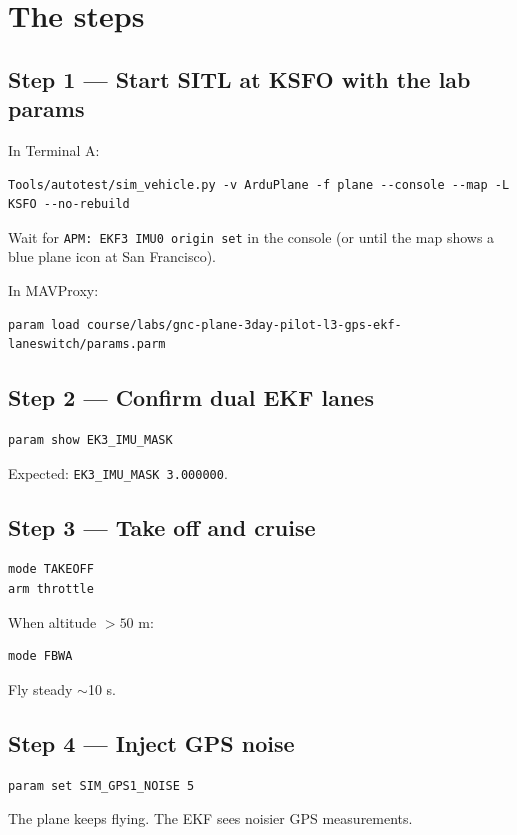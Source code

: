 \documentclass[a4paper,11pt,twoside]{article}
\begin{document}
\section*{The steps}

\subsection*{Step 1 --- Start SITL at KSFO with the lab params}
In Terminal A:
\begin{Verbatim}[frame=single,fontsize=\small]
Tools/autotest/sim_vehicle.py -v ArduPlane -f plane --console --map -L KSFO --no-rebuild
\end{Verbatim}
Wait for \texttt{APM: EKF3 IMU0 origin set} in the console (or until the map shows a blue plane icon at San Francisco).

In MAVProxy:
\begin{Verbatim}[frame=single,fontsize=\small]
param load course/labs/gnc-plane-3day-pilot-l3-gps-ekf-laneswitch/params.parm
\end{Verbatim}

\subsection*{Step 2 --- Confirm dual EKF lanes}
\begin{Verbatim}[frame=single,fontsize=\small]
param show EK3_IMU_MASK
\end{Verbatim}
Expected: \texttt{EK3\_IMU\_MASK 3.000000}.

\subsection*{Step 3 --- Take off and cruise}
\begin{Verbatim}[frame=single,fontsize=\small]
mode TAKEOFF
arm throttle
\end{Verbatim}
When altitude $> 50$ m:
\begin{Verbatim}[frame=single,fontsize=\small]
mode FBWA
\end{Verbatim}
Fly steady $\sim$10 s.

\subsection*{Step 4 --- Inject GPS noise}
\begin{Verbatim}[frame=single,fontsize=\small]
param set SIM_GPS1_NOISE 5
\end{Verbatim}
The plane keeps flying. The EKF sees noisier GPS measurements.
\end{document}
